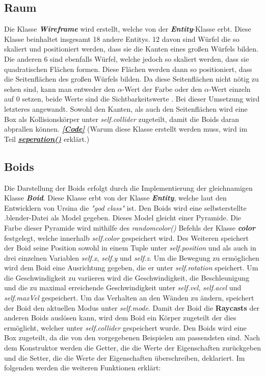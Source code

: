 \documentclass[a4paper, hidelinks, 12pt]{article}
\begin{document}
\subsection{Raum}\label{Wireframe}
Die Klasse \textbf{\emph{Wireframe}} wird erstellt, welche von der \textbf{\emph{Entity}}-Klasse\cite{2022l} erbt. Diese Klasse beinhaltet insgesamt 18 andere Entitys. 12 davon sind Würfel die so skaliert und positioniert werden, dass sie die Kanten eines großen Würfels bilden. Die anderen 6 sind ebenfalls Würfel, welche jedoch so skaliert werden, dass sie quadratischen Flächen formen. Diese Flächen werden dann so positioniert, dass die Seitenflächen des großen Würfels bilden. Da diese Seitenflächen nicht nötig zu sehen sind, kann man entweder den $\alpha$-Wert der Farbe oder den $\alpha$-Wert einzeln auf 0 setzen, beide Werte sind die Sichtbarkeitswerte \cite{2022p}. Bei dieser Umsetzung wird letzteres angewandt. Sowohl den Kanten, als auch den Seitenflächen wird eine Box als Kollisionskörper unter \emph{self.collider} zugeteilt, damit die Boids daran abprallen können\cite{2022r}. \hyperref[CodeRaum]{\textbf{\emph{[Code]}}} \newline\newline \scriptsize (Warum diese Klasse erstellt werden muss, wird im Teil \hyperref[sec:seperation]{\textbf{\emph{seperation()}}} erklärt.)
\newpage
\normalsize\subsection{Boids}\label{sec:Boid}
Die Darstellung der Boids erfolgt durch die Implementierung der gleichnamigen Klasse \textbf{\emph{Boid}}. Diese Klasse erbt von der Klasse \textbf{\emph{Entity}}\cite{2022l}, welche laut den Entwicklern von Ursina die \emph{"god class"} ist\cite{godclass}. 
Den Boids wird eine selbsterstellte .blender-Datei als Model gegeben. Dieses Model gleicht einer Pyramide. Die Farbe dieser Pyramide wird mithilfe des \emph{random\textunderscore color()} Befehls der Klasse \textbf{\emph{color}} festgelegt, welche innerhalb \emph{self.color} gespeichert wird\cite{color}. Des Weiteren speichert der Boid seine Position sowohl in einem Tuple unter \emph{self.position} und als auch in drei einzelnen Variablen \emph{self.x}, \emph{self.y} und \emph{self.z}. Um die Bewegung zu ermöglichen wird dem Boid eine Ausrichtung gegeben, die er unter \emph{self.rotation} speichert\cite{2022l}. Um die Geschwindigkeit zu variieren wird die Geschwindigkeit, die Beschleunigung und die zu maximal erreichende Geschwindigkeit unter \emph{self.vel}, \emph{self.acel} und \emph{self.maxVel} gespeichert. Um das Verhalten an den Wänden zu ändern, speichert der Boid den aktuellen Modus unter \emph{self.mode}. Damit der Boid die \textbf{Raycasts}\cite{raycast} der anderen Boids auslösen kann, wird dem Boid ein Körper zugeteilt der dies ermöglicht, welcher unter \emph{self.collider} gespeichert wurde. Den Boids wird eine Box zugeteilt, da die von den vorgegebenen Beispielen am passendsten sind\cite{2022r}.
Nach dem Konstruktor werden die Getter, die die Werte der Eigenschaften zurückgeben und die Setter, die die Werte der Eigenschaften überschreiben, deklariert.
Im folgenden werden die weiteren Funktionen erklärt:\newline
	
\end{document}
